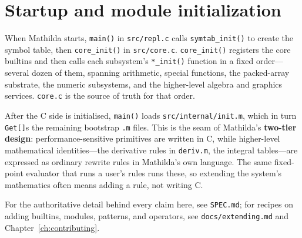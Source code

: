 \section{Startup and module initialization}
\label{app:init}

When Mathilda starts, \texttt{main()} in \texttt{src/repl.c} calls
\texttt{symtab\_init()} to create the symbol table, then \texttt{core\_init()} in
\texttt{src/core.c}. \texttt{core\_init()} registers the core builtins and then calls
each subsystem's \texttt{*\_init()} function in a fixed order---several dozen of them,
spanning arithmetic, special functions, the packed-array substrate, the numeric
subsystems, and the higher-level algebra and graphics services. \texttt{core.c} is
the source of truth for that order.

After the C side is initialised, \texttt{main()} loads
\texttt{src/internal/init.m}, which in turn \texttt{Get[]}s the remaining bootstrap
\texttt{.m} files. This is the seam of Mathilda's \textbf{two-tier design}:
performance-sensitive primitives are written in C, while higher-level mathematical
identities---the derivative rules in \texttt{deriv.m}, the integral tables---are
expressed as ordinary rewrite rules in Mathilda's own language. The same fixed-point
evaluator that runs a user's rules runs these, so extending the system's mathematics
often means adding a rule, not writing C.

\bigskip
\noindent
For the authoritative detail behind every claim here, see \texttt{SPEC.md}; for
recipes on adding builtins, modules, patterns, and operators, see
\texttt{docs/extending.md} and Chapter~\ref{ch:contributing}.
